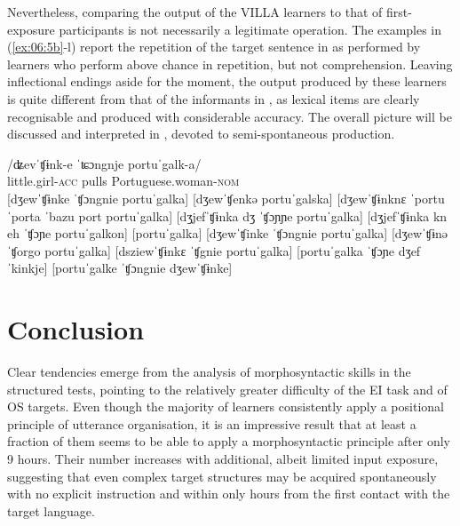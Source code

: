Nevertheless, comparing the output of the VILLA learners to that of first-exposure participants is not necessarily a legitimate operation. The examples in (\ref{ex:06:5b}-l) report the repetition of the target sentence in  as performed by learners who perform above chance in repetition, but not comprehension. Leaving inflectional endings aside for the moment, the output produced by these learners is quite different from that of the informants in , as lexical items are clearly recognisable and produced with considerable accuracy. The overall picture will be discussed and interpreted in , devoted to semi-spontaneous production.

\ea%
    \label{ex:06:5}
    \ea\label{ex:06:5a}
    \gll    /ʥevˈʧɨnk-e   ˈʨɔngnje   portuˈgalk-a/\\
            little.girl-\textsc{acc}   pulls     Portuguese.woman-\textsc{nom}\\
    \ex\label{ex:06:5b}
    [dʒewˈʧɨnke ˈʧɔngnie portuˈgalka]
    \ex\label{ex:06:5c}
    [dʒewˈʧenkə portuˈgalska]
    \ex\label{ex:06:5d}
    [dʒewˈʧɨnknɛ ˈportu ˈporta ˈbazu port portuˈgalka]
    \ex\label{ex:06:5e}
    [dʒjefˈʧɨnka dʒ ˈʧɔɲɲe portuˈgalka]
    \ex\label{ex:06:5f}
    [dʒjefˈʧɨnka kn eh ˈʧɔɲe portuˈgalkon]
    \ex\label{ex:06:5g}
    [portuˈgalka]
    \ex\label{ex:06:5h}
    [dʒewˈʧinke ˈʧɔngnie portuˈgalka]
    \ex\label{ex:06:5i}
    [dʒewˈʧɨnə ˈʧorgo portuˈgalka]
    \ex\label{ex:06:5j}
    [dsziewˈʧɨnkɛ ˈʧgnie portuˈgalka]
    \ex\label{ex:06:5l}
    [portuˈgalka ˈʧɔɲe dʒefˈkinkje]
    \ex\label{ex:06:5m}
    [portuˈgalke ˈʧɔngnie dʒewˈʧɨnke]
    \z
\z

\section{Conclusion}\label{sec:06:5}

Clear tendencies emerge from the analysis of morphosyntactic skills in the structured tests, pointing to the relatively greater difficulty of the EI task and of OS targets. Even though the majority of learners consistently apply a positional principle of utterance organisation, it is an impressive result that at least a fraction of them seems to be able to apply a morphosyntactic principle after only 9 hours. Their number increases with additional, albeit limited input exposure, suggesting that even complex target structures may be acquired spontaneously with no explicit instruction and within only hours from the first contact with the target language.
